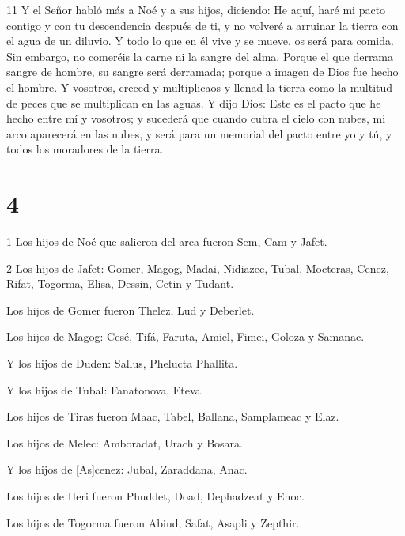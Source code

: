 \par 11 Y el Señor habló más a Noé y a sus hijos, diciendo: He aquí, haré mi pacto contigo y con tu descendencia después de ti, y no volveré a arruinar la tierra con el agua de un diluvio. Y todo lo que en él vive y se mueve, os será para comida. Sin embargo, no comeréis la carne ni la sangre del alma. Porque el que derrama sangre de hombre, su sangre será derramada; porque a imagen de Dios fue hecho el hombre. Y vosotros, creced y multiplicaos y llenad la tierra como la multitud de peces que se multiplican en las aguas. Y dijo Dios: Este es el pacto que he hecho entre mí y vosotros; y sucederá que cuando cubra el cielo con nubes, mi arco aparecerá en las nubes, y será para un memorial del pacto entre yo y tú, y todos los moradores de la tierra.

\chapter{4}

\par 1 Los hijos de Noé que salieron del arca fueron Sem, Cam y Jafet.

\par 2 Los hijos de Jafet: Gomer, Magog, Madai, Nidiazec, Tubal, Mocteras, Cenez, Rifat, Togorma, Elisa, Dessin, Cetin y Tudant.

\par Los hijos de Gomer fueron Thelez, Lud y Deberlet.

\par Los hijos de Magog: Cesé, Tifá, Faruta, Amiel, Fimei, Goloza y Samanac.

\par Y los hijos de Duden: Sallus, Phelucta Phallita.

\par Y los hijos de Tubal: Fanatonova, Eteva.

\par Los hijos de Tiras fueron Maac, Tabel, Ballana, Samplameac y Elaz.

\par Los hijos de Melec: Amboradat, Urach y Bosara.

\par Y los hijos de [As]cenez: Jubal, Zaraddana, Anac.

\par Los hijos de Heri fueron Phuddet, Doad, Dephadzeat y Enoc.

\par Los hijos de Togorma fueron Abiud, Safat, Asapli y Zepthir.

